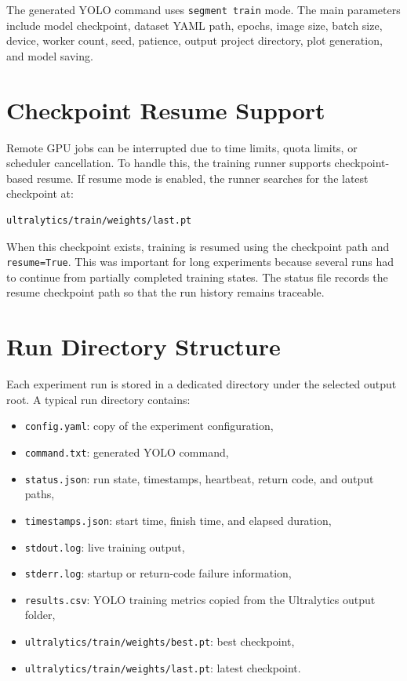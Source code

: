 The generated YOLO command uses \texttt{segment train} mode. The main parameters include model checkpoint, dataset YAML path, epochs, image size, batch size, device, worker count, seed, patience, output project directory, plot generation, and model saving.

\section{Checkpoint Resume Support}

Remote GPU jobs can be interrupted due to time limits, quota limits, or scheduler cancellation. To handle this, the training runner supports checkpoint-based resume. If resume mode is enabled, the runner searches for the latest checkpoint at:

\begin{verbatim}
ultralytics/train/weights/last.pt
\end{verbatim}

When this checkpoint exists, training is resumed using the checkpoint path and \texttt{resume=True}. This was important for long experiments because several runs had to continue from partially completed training states. The status file records the resume checkpoint path so that the run history remains traceable.

\section{Run Directory Structure}

Each experiment run is stored in a dedicated directory under the selected output root. A typical run directory contains:

\begin{itemize}
    \item \texttt{config.yaml}: copy of the experiment configuration,
    \item \texttt{command.txt}: generated YOLO command,
    \item \texttt{status.json}: run state, timestamps, heartbeat, return code, and output paths,
    \item \texttt{timestamps.json}: start time, finish time, and elapsed duration,
    \item \texttt{stdout.log}: live training output,
    \item \texttt{stderr.log}: startup or return-code failure information,
    \item \texttt{results.csv}: YOLO training metrics copied from the Ultralytics output folder,
    \item \texttt{ultralytics/train/weights/best.pt}: best checkpoint,
    \item \texttt{ultralytics/train/weights/last.pt}: latest checkpoint.
\end{itemize}

